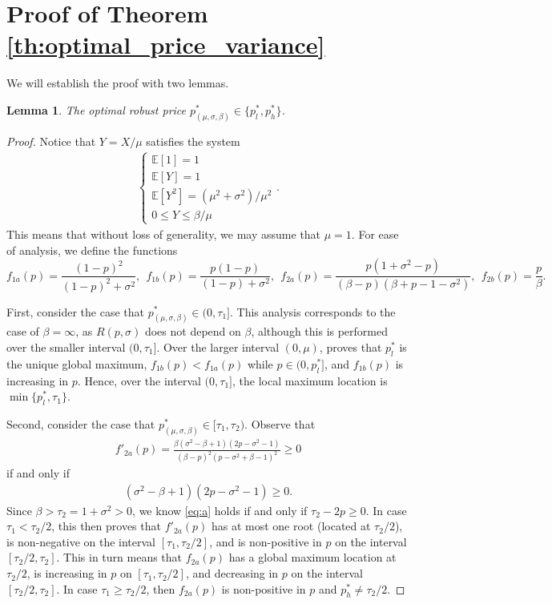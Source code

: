 \documentclass[11pt]{article}
\newtheorem{lemma}{Lemma}[section]
\newcommand{\E}{\mathbb{E}}
\newcommand{\1}{\mathds{1}}
\begin{document}
\section{Proof of Theorem \ref{th:optimal_price_variance}}\label{appendix_variance}
We will establish the proof with two lemmas.
\begin{lemma}\label{lemma:price1}
    The optimal robust price $p^*_{(\mu,\sigma,\beta)} \in \{p^*_l,p^*_h\}$.
\end{lemma}
\begin{proof}
Notice that $Y = X/\mu$ satisfies the system
\begin{align}
    \left\{
\begin{array}{l}
     \E[1] = 1 \\
     \E[Y] = 1\\
     \E[Y^2] = (\mu^2+\sigma^2)/\mu^2 \\
     0 \leq Y \leq \beta/\mu
\end{array}\right..
\label{eq:equations_scaled}
\end{align}
This means that without loss of generality, we may assume that $\mu = 1$. For ease of analysis, we define the functions
$$f_{1a}(p) = \frac{(1-p)^2}{(1-p)^2+\sigma^2},\ \ f_{1b}(p) = \frac{p(1-p)}{(1-p)+\sigma^2},\ \ f_{2a}(p) = \frac{p(1+\sigma^2-p)}{(\beta-p)(\beta+p-1-\sigma^2)}, \ \ f_{2b}(p) = \frac{p}{\beta}.$$

First, consider the case that $p_{(\mu,\sigma,\beta)}^* \in (0,\tau_1]$. This analysis corresponds to the case of $\beta = \infty$, as $R(p,\sigma)$ does not depend on $\beta$, although this is performed over the smaller interval $(0,\tau_1]$. Over the larger interval $(0, \mu)$, \cite{giannakopoulos2019robust} proves that $p_l^*$ is the unique global maximum, $f_{1b}(p) < f_{1a}(p)$ while $p \in (0,p^*_l]$, and $f_{1b}(p)$ is increasing in $p$. Hence, over the interval $(0,\tau_1]$, the local maximum location is $\min\{p_l^*,\tau_1\}$. 

Second, consider the case that $p_{(\mu,\sigma,\beta)}^* \in [\tau_1,\tau_2)$.  Observe that
\begin{align}
    f'_{2a}(p) = \frac{\beta(\sigma^2-\beta+1)(2p-\sigma^2-1)}{(\beta-p)^2(p-\sigma^2+\beta-1)^2}\geq 0
\end{align}
if and only if 
\begin{align}\label{eq:a}
    (\sigma^2-\beta+1)(2p-\sigma^2-1) \geq 0.
\end{align} Since $\beta > \tau_2 = 1 + \sigma^2 > 0$, we know \eqref{eq:a} holds if and only if $\tau_2 - 2p \geq 0$.
In case $\tau_1 < \tau_2/2$, this then proves that $f'_{2a}(p)$ has at most one root (located at $\tau_2/2$), is non-negative on the interval $[\tau_1,\tau_2/2]$, and is non-positive in $p$ on the interval $[\tau_2/2,\tau_2]$. This in turn means that $f_{2a}(p)$ has a global maximum location at $\tau_2/2$, is increasing in $p$ on $[\tau_1,\tau_2/2]$, and decreasing in $p$ on the interval $[\tau_2/2,\tau_2]$. In case $\tau_1 \geq \tau_2/2$, then $f_{2a}(p)$ is non-positive in $p$ and $p^*_h \neq \tau_2/2$.


\end{proof}
\end{document}
